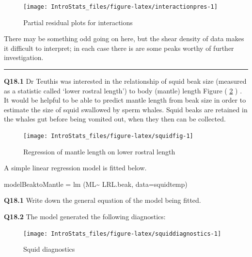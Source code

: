 \documentclass[
  oneside]{krantz}
\newenvironment{Shaded}{\begin{snugshade}}{\end{snugshade}}
\newcommand{\AttributeTok}[1]{\textcolor[rgb]{0.77,0.63,0.00}{#1}}
\newcommand{\FunctionTok}[1]{\textcolor[rgb]{0.00,0.00,0.00}{#1}}
\newcommand{\NormalTok}[1]{#1}
\newcommand{\OtherTok}[1]{\textcolor[rgb]{0.56,0.35,0.01}{#1}}
\newcommand{\SpecialCharTok}[1]{\textcolor[rgb]{0.00,0.00,0.00}{#1}}
\begin{document}
\begin{figure}

{\centering \texttt{[image: IntroStats\_files/figure-latex/interactionpres-1]} 

}

\caption{Partial residual plots for interactions}\label{fig:interactionpres}
\end{figure}

There may be something odd going on here, but the shear density of data makes it difficult to interpret; in each case there is are some peaks worthy of further investigation.

\begin{center}\rule{0.5\linewidth}{0.5pt}\end{center}

\textbf{Q18.1} Dr Teuthis was interested in the relationship of squid beak size (measured as a statistic called `lower rostral length') to body (mantle) length Figure ( \ref{fig:squidfig} ) . It would be helpful to be able to predict mantle length from beak size in order to estimate the size of squid swallowed by sperm whales. Squid beaks are retained in the whales gut before being vomited out, when they then can be collected.

\begin{figure}

{\centering \texttt{[image: IntroStats\_files/figure-latex/squidfig-1]} 

}

\caption{Regression of mantle length on lower rostral length}\label{fig:squidfig}
\end{figure}

A simple linear regression model is fitted below.

\begin{Shaded}
\begin{Highlighting}[]
\NormalTok{modelBeaktoMantle }\OtherTok{=}  \FunctionTok{lm}\NormalTok{ (ML}\SpecialCharTok{\textasciitilde{}}\NormalTok{ LRL.beak, }\AttributeTok{data=}\NormalTok{squidtemp)}
\end{Highlighting}
\end{Shaded}

\textbf{Q18.1} Write down the general equation of the model being fitted.

\textbf{Q18.2} The model generated the following diagnostics:

\begin{figure}

{\centering \texttt{[image: IntroStats\_files/figure-latex/squiddiagnostics-1]} 

}

\caption{Squid diagnostics}\label{fig:squiddiagnostics}
\end{figure}
\end{document}
